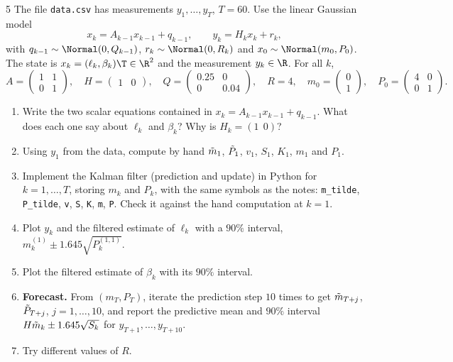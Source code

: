 \begin{homework}{5}
The file \texttt{data.csv} has measurements $y_1, \dots, y_T$, $T = 60$. Use the linear Gaussian model
\[
x_k = A_{k-1}x_{k-1} + q_{k-1}, \qquad y_k = H_kx_k + r_k,
\]
with $q_{k-1} \sim \Normal(0, Q_{k-1})$, $r_k \sim \Normal(0, R_k)$ and $x_0 \sim \Normal(m_0, P_0)$. The state is $x_k = (\ell_k, \beta_k)\T \in \R^2$ and the measurement $y_k \in \R$. For all $k$,
\[
A = \begin{pmatrix}1 & 1\\ 0 & 1\end{pmatrix},\quad
H = \begin{pmatrix}1 & 0\end{pmatrix},\quad
Q = \begin{pmatrix}0.25 & 0\\ 0 & 0.04\end{pmatrix},\quad
R = 4,\quad
m_0 = \begin{pmatrix}0\\ 1\end{pmatrix},\quad
P_0 = \begin{pmatrix}4 & 0\\ 0 & 1\end{pmatrix}.
\]
\begin{enumerate}[label=(\arabic*)]
\item Write the two scalar equations contained in $x_k = A_{k-1}x_{k-1} + q_{k-1}$. What does each one say about $\ell_k$ and $\beta_k$? Why is $H_k = (1\ \ 0)$?
\item Using $y_1$ from the data, compute by hand $\tilde m_1$, $\tilde P_1$, $v_1$, $S_1$, $K_1$, $m_1$ and $P_1$.
\item Implement the Kalman filter (prediction and update) in Python for $k = 1, \dots, T$, storing $m_k$ and $P_k$, with the same symbols as the notes: \texttt{m\_tilde}, \texttt{P\_tilde}, \texttt{v}, \texttt{S}, \texttt{K}, \texttt{m}, \texttt{P}. Check it against the hand computation at $k = 1$.
\item Plot $y_k$ and the filtered estimate of $\ell_k$ with a $90\%$ interval, $m_k^{(1)} \pm 1.645\sqrt{P_k^{(1,1)}}$.
\item Plot the filtered estimate of $\beta_k$ with its $90\%$ interval.
\item \textbf{Forecast.} From $(m_T, P_T)$, iterate the prediction step $10$ times to get $\tilde m_{T+j}$, $\tilde P_{T+j}$, $j = 1, \dots, 10$, and report the predictive mean and $90\%$ interval $H\tilde m_{k} \pm 1.645\sqrt{S_k}$ for $y_{T+1}, \dots, y_{T+10}$.
\item Try different values of $R$.
\end{enumerate}


\end{homework}
